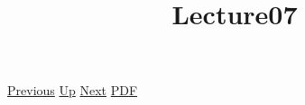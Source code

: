\documentclass[12pt,a4paper]{report}
\begin{document}
 \href{doc/phil/People/Brandom/Antirepresentationalism/Lecture06.html}{Previous} 
 \href{doc/phil/People/Brandom/Antirepresentationalism.html}{Up} 
 \href{doc/phil/People/Brandom/Antirepresentationalism/Lecture08.html}{Next} 
 \href{doc/phil/People/Brandom/Antirepresentationalism/Lecture07.pdf}{PDF} 
\title{Lecture07}

\tableofcontents
\end{document}
